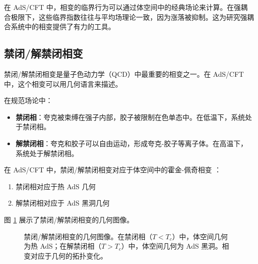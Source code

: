 \begin{remark}
在 AdS/CFT 中，相变的临界行为可以通过体空间中的经典场论来计算。在强耦合极限下，这些临界指数往往与平均场理论一致，因为涨落被抑制。这为研究强耦合系统中的相变提供了有力的工具。
\end{remark}

\subsection{禁闭/解禁闭相变}

禁闭/解禁闭相变是量子色动力学（QCD）中最重要的相变之一。在 AdS/CFT 中，这个相变可以用几何语言来描述。

\begin{definition}[禁闭相与解禁闭相]
在规范场论中：
\begin{itemize}
    \item \textbf{禁闭相}：夸克被束缚在强子内部，胶子被限制在色单态中。在低温下，系统处于禁闭相。
    \item \textbf{解禁闭相}：夸克和胶子可以自由运动，形成夸克-胶子等离子体。在高温下，系统处于解禁闭相。
\end{itemize}
\end{definition}

\begin{theorem}[禁闭/解禁闭相变的全息对应]
在 AdS/CFT 中，禁闭/解禁闭相变对应于体空间中的霍金-佩奇相变 \cite{Witten1998b}：
\begin{enumerate}
    \item 禁闭相对应于热 AdS 几何
    \item 解禁闭相对应于 AdS 黑洞几何
\end{enumerate}
\end{theorem}

图 \ref{fig:confinement_deconfinement} 展示了禁闭/解禁闭相变的几何图像。

\begin{figure}[htbp]
\centering
{}
\caption{禁闭/解禁闭相变的几何图像。在禁闭相（$T < T_c$）中，体空间几何为热 AdS；在解禁闭相（$T > T_c$）中，体空间几何为 AdS 黑洞。相变对应于几何的拓扑变化。}
\label{fig:confinement_deconfinement}
\end{figure}


